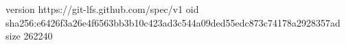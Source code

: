 version https://git-lfs.github.com/spec/v1
oid sha256:e6426f3a26e4f6563bb3b10c423ad3c544a09ded55edc873c74178a2928357ad
size 262240
